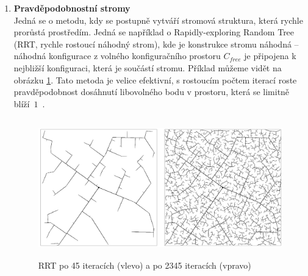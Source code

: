 \begin{enumerate}
\begin{enumerate}
		\item \textbf{Pravděpodobnostní stromy}\\
		Jedná se o metodu, kdy se postupně vytváří stromová struktura, která rychle prorůstá prostředím. Jedná se například o Rapidly-exploring Random Tree (RRT, rychle rostoucí náhodný strom), kde je konstrukce stromu náhodná -- náhodná konfigurace z volného konfiguračního prostoru $C_{free}$ je připojena k nejbližší konfiguraci, která je součástí stromu. Příklad můžeme vidět na obrázku \ref{obr:RRT}. Tato metoda je velice efektivní, s rostoucím počtem iterací roste pravděpodobnost dosáhnutí libovolného bodu v prostoru, která se limitně blíží~$1$~\cite{LaValle2006}. 
		
		\begin{figure}[h!]
			\begin{center}
				\includegraphics*[width=15cm,height=6cm,keepaspectratio]{obr/RRT}
			\end{center}
			\vspace*{4mm}
			\caption{RRT po 45 iteracích (vlevo) a po 2345 iteracích (vpravo) \cite{LaValle2006}}
			\label{obr:RRT}
		\end{figure}
	\end{enumerate}
\end{enumerate} 

